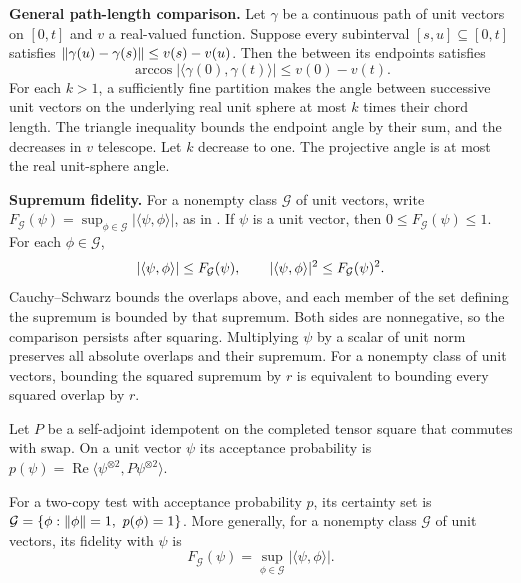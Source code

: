 \begin{lemma}
  \textbf{General path-length comparison.}
  Let $\gamma$ be a continuous path of unit vectors on $[0,t]$ and $v$ a
  real-valued function. Suppose every subinterval $[s,u]\subseteq[0,t]$
  satisfies $\lVert \gamma(u)-\gamma(s) \rVert\le v(s)-v(u)$. Then the
   between its endpoints satisfies
  \[
    \arccos|\langle\gamma(0),\gamma(t)\rangle|\le v(0)-v(t).
  \]
  For each $k>1$, a sufficiently fine partition makes the angle between
  successive unit vectors on the underlying real unit sphere at most $k$
  times their chord length. The triangle inequality bounds the endpoint
  angle by their sum, and the decreases in $v$ telescope. Let $k$ decrease
  to one. The projective angle is at most the real unit-sphere angle.

  \textbf{Supremum fidelity.}
  For a nonempty class $\mathcal G$ of unit vectors, write
  $F_{\mathcal G}(\psi)=\sup_{\phi\in\mathcal G}|\langle\psi,\phi\rangle|$,
  as in . If $\psi$ is a unit vector, then
  $0\le F_{\mathcal G}(\psi)\le1$. For each
  $\phi\in\mathcal G$,
  \[
    |\langle\psi,\phi\rangle|\le F_{\mathcal G}(\psi),
    \qquad \lvert\langle \psi, \phi\rangle\rvert^2\le F_{\mathcal G}(\psi)^2.
  \]
  Cauchy--Schwarz bounds the overlaps above, and each member of the set
  defining the supremum is bounded by that supremum. Both sides are
  nonnegative, so the comparison persists after squaring. Multiplying $\psi$
  by a scalar of unit norm preserves all absolute overlaps and their supremum.
  For a nonempty class of unit vectors, bounding the squared supremum by $r$
  is equivalent to bounding every squared overlap by $r$.
\end{lemma}

\begin{definition}\label{def:acceptance}
  \leanok
  \par
  Let $P$ be a self-adjoint idempotent on the completed tensor square that commutes with
  swap. On a unit vector $\psi$ its acceptance probability is
  $p(\psi)=\operatorname{Re}\langle\psi^{\otimes2},P\psi^{\otimes2}\rangle$.
\end{definition}

\begin{definition}\label{def:fidelity}
  \leanok
  \par
  For a two-copy test with acceptance probability $p$, its certainty set is
  $\mathcal G=\{\phi:\lVert \phi \rVert=1,\ p(\phi)=1\}$. More generally, for a
  nonempty class $\mathcal G$ of unit vectors, its fidelity with $\psi$ is
  \[
    F_{\mathcal G}(\psi)=\sup_{\phi\in\mathcal G}
      |\langle\psi,\phi\rangle|.
  \]
\end{definition}

